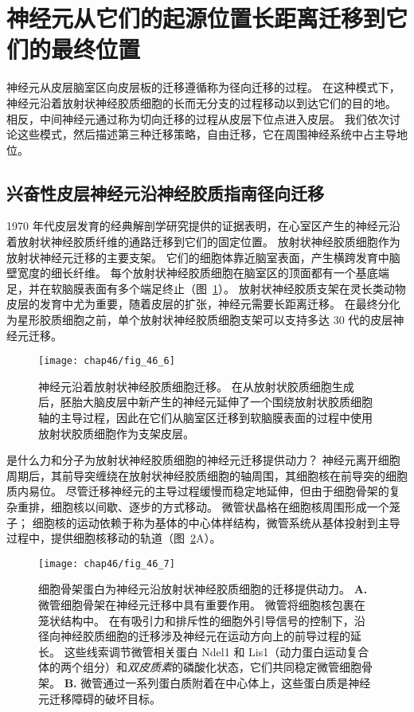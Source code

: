 \section{神经元从它们的起源位置长距离迁移到它们的最终位置}

神经元从皮层脑室区向皮层板的迁移遵循称为径向迁移的过程。
在这种模式下，神经元沿着放射状神经胶质细胞的长而无分支的过程移动以到达它们的目的地。
相反，中间神经元通过称为切向迁移的过程从皮层下位点进入皮层。
我们依次讨论这些模式，然后描述第三种迁移策略，自由迁移，它在周围神经系统中占主导地位。



\subsection{兴奋性皮层神经元沿神经胶质指南径向迁移}

1970 年代皮层发育的经典解剖学研究提供的证据表明，在心室区产生的神经元沿着放射状神经胶质纤维的通路迁移到它们的固定位置。
放射状神经胶质细胞作为放射状神经元迁移的主要支架。
它们的细胞体靠近脑室表面，产生横跨发育中脑壁宽度的细长纤维。
每个放射状神经胶质细胞在脑室区的顶面都有一个基底端足，并在软脑膜表面有多个端足终止（图~\ref{fig:46_6}）。
放射状神经胶质支架在灵长类动物皮层的发育中尤为重要，随着皮层的扩张，神经元需要长距离迁移。
在最终分化为星形胶质细胞之前，单个放射状神经胶质细胞支架可以支持多达 30 代的皮层神经元迁移。


\begin{figure}[htbp]
	\centering
	\texttt{[image: chap46/fig\_46\_6]}
	\caption{神经元沿着放射状神经胶质细胞迁移。
		在从放射状胶质细胞生成后，胚胎大脑皮层中新产生的神经元延伸了一个围绕放射状胶质细胞轴的主导过程，因此在它们从脑室区迁移到软脑膜表面的过程中使用放射状胶质细胞作为支架皮层。}
	\label{fig:46_6}
\end{figure}


是什么力和分子为放射状神经胶质细胞的神经元迁移提供动力？
神经元离开细胞周期后，其前导突缠绕在放射状神经胶质细胞的轴周围，其细胞核在前导突的细胞质内易位。
尽管迁移神经元的主导过程缓慢而稳定地延伸，但由于细胞骨架的复杂重排，细胞核以间歇、逐步的方式移动。 
微管状晶格在细胞核周围形成一个笼子；
细胞核的运动依赖于称为基体的中心体样结构，微管系统从基体投射到主导过程中，提供细胞核移动的轨道（图~\ref{fig:46_7}A）。


\begin{figure}[htbp]
	\centering
	\texttt{[image: chap46/fig\_46\_7]}
	\caption{细胞骨架蛋白为神经元沿放射状神经胶质细胞的迁移提供动力。
		\textbf{A.} 微管细胞骨架在神经元迁移中具有重要作用。
		微管将细胞核包裹在笼状结构中。
		在有吸引力和排斥性的细胞外引导信号的控制下，沿径向神经胶质细胞的迁移涉及神经元在运动方向上的前导过程的延长。
		这些线索调节微管相关蛋白 Ndel1 和 Lis1（动力蛋白运动复合体的两个组分）和\textit{双皮质素}的磷酸化状态，它们共同稳定微管细胞骨架\cite{gleeson2000neuronal}。
		\textbf{B.} 微管通过一系列蛋白质附着在中心体上，这些蛋白质是神经元迁移障碍的破坏目标。}
	\label{fig:46_7}
\end{figure}


